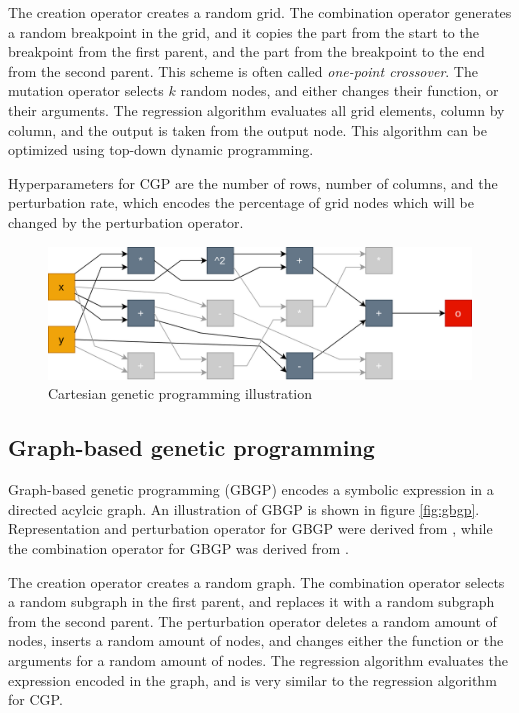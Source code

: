 The creation operator creates a random grid. The combination operator generates a random breakpoint in the grid, and it copies the part from the start to the breakpoint from the first parent, and the part from the breakpoint to the end from the second parent. This scheme is often called \textit{one-point crossover}. The mutation operator selects $k$ random nodes, and either changes their function, or their arguments. The regression algorithm evaluates all grid elements, column by column, and the output is taken from the output node. This algorithm can be optimized using top-down dynamic programming.

Hyperparameters for CGP are the number of rows, number of columns, and the perturbation rate, which encodes the percentage of grid nodes which will be changed by the perturbation operator.

\begin{figure}[!htbp]
	\centering
	\includegraphics[scale=0.3]{../images/cgp.png}
	\caption{Cartesian genetic programming illustration}
    \label{fig:cgp}
\end{figure}

\subsection{Graph-based genetic programming}

Graph-based genetic programming (GBGP) encodes a symbolic expression in a directed acylcic graph. An illustration of GBGP is shown in figure \ref{fig:gbgp}. Representation and perturbation operator for GBGP were derived from \citep{gbgp}, while the combination operator for GBGP was derived from \citep{gbgp_operators}.

The creation operator creates a random graph. The combination operator selects a random subgraph in the first parent, and replaces it with a random subgraph from the second parent. The perturbation operator deletes a random amount of nodes, inserts a random amount of nodes, and changes either the function or the arguments for a random amount of nodes. The regression algorithm evaluates the expression encoded in the graph, and is very similar to the regression algorithm for CGP.


